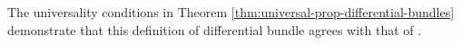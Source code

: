 \begin{remark}
  The universality conditions in Theorem \ref{thm:universal-prop-differential-bundles} demonstrate that this definition of differential bundle agrees with that of \cite{Cockett2018}.%
\end{remark}

